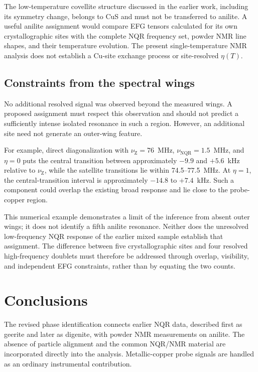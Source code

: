 \documentclass[10pt,a4paper,twocolumn]{article}
\newcommand{\nqr}{\mathrm{NQR}}
\newcommand{\nuz}{\nu_{\mathrm Z}}
\begin{document}
The low-temperature covellite structure discussed in the earlier work, including its symmetry change, belongs to CuS and must not be transferred to anilite. A useful anilite assignment would compare EFG tensors calculated for its own crystallographic sites with the complete NQR frequency set, powder NMR line shapes, and their temperature evolution. The present single-temperature NMR analysis does not establish a Cu-site exchange process or site-resolved $\eta(T)$.

\subsection{Constraints from the spectral wings}

No additional resolved signal was observed beyond the measured wings. A proposed assignment must respect this observation and should not predict a sufficiently intense isolated resonance in such a region. However, an additional site need not generate an outer-wing feature.

For example, direct diagonalization with $\nuz=76$~MHz, $\nu_{\nqr}=1.5$~MHz, and $\eta=0$ puts the central transition between approximately $-9.9$ and $+5.6$~kHz relative to $\nuz$, while the satellite transitions lie within 74.5--77.5~MHz. At $\eta=1$, the central-transition interval is approximately $-14.8$ to $+7.4$~kHz. Such a component could overlap the existing broad response and lie close to the probe-copper region.

This numerical example demonstrates a limit of the inference from absent outer wings; it does not identify a fifth anilite resonance. Neither does the unresolved low-frequency NQR response of the earlier mixed sample establish that assignment. The difference between five crystallographic sites and four resolved high-frequency doublets must therefore be addressed through overlap, visibility, and independent EFG constraints, rather than by equating the two counts.

\section{Conclusions}

The revised phase identification connects earlier NQR data, described first as geerite and later as digenite, with powder NMR measurements on anilite. The absence of particle alignment and the common NQR/NMR material are incorporated directly into the analysis. Metallic-copper probe signals are handled as an ordinary instrumental contribution.
\end{document}
